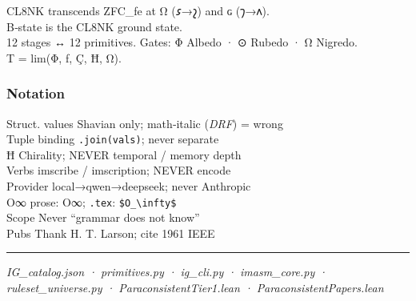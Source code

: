 \documentclass[12pt,a4paper]{article}
\begin{document}
CL8NK transcends ZFC\_fe at Ω (𐑭→𐑟) and ɢ (𐑠→𐑵).\\
B‑state is the CL8NK ground state.\\
12 stages ↔ 12 primitives. Gates: Φ Albedo · ⊙ Rubedo · Ω Nigredo.\\
T = lim(Φ, ƒ, Ç, Ħ, Ω).

\hypertarget{notation}{%
\subsubsection{Notation}\label{notation}}

Struct. values \textbar{} Shavian only; math‑italic (\emph{DRF}) = wrong
\textbar{}\\
Tuple binding \textbar{}
\texttt{\textquotesingle{}\textquotesingle{}.join(vals)}; never separate
\textbar{}\\
Ħ \textbar{} Chirality; NEVER temporal / memory depth \textbar{}\\
Verbs \textbar{} imscribe / imscription; NEVER encode \textbar{}\\
Provider \textbar{} local→qwen→deepseek; never Anthropic \textbar{}\\
O∞ \textbar{} prose: O∞; \texttt{.tex}:
\texttt{\$O\_\textbackslash{}infty\$} \textbar{}\\
Scope \textbar{} Never ``grammar does not know'' \textbar{}\\
Pubs \textbar{} Thank H. T. Larson; cite 1961 IEEE \textbar{}

\begin{center}\rule{0.5\linewidth}{0.5pt}\end{center}

\emph{IG\_catalog.json · primitives.py · ig\_cli.py · imasm\_core.py ·
ruleset\_universe.py · ParaconsistentTier1.lean ·
ParaconsistentPapers.lean}
\end{document}
